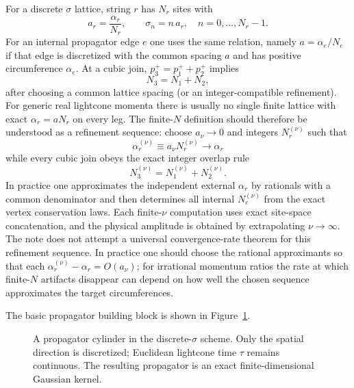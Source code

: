 \documentclass[11pt]{article}
\numberwithin{equation}{section}
\begin{document}
For a discrete $\sigma$ lattice, string $r$ has $N_r$ sites with
\begin{equation}
\label{eq:s4-003}
a_r=\frac{\alpha_r}{N_r},\qquad \sigma_n=n\,a_r,\quad n=0,\dots,N_r-1.
\end{equation}
For an internal propagator edge $e$ one uses the same relation, namely $a=\alpha_e/N_e$ if that edge is discretized with the common spacing $a$ and has positive circumference $\alpha_e$.
At a cubic join, $p_3^+=p_1^++p_2^+$ implies
\begin{equation}
\label{eq:s4-004}
N_3=N_1+N_2,
\end{equation}
after choosing a common lattice spacing (or an integer-compatible refinement).
For generic real lightcone momenta there is usually no single finite lattice with exact $\alpha_r=aN_r$ on every leg. The finite-$N$ definition should therefore be understood as a refinement sequence: choose $a_\nu\to 0$ and integers $N_r^{(\nu)}$ such that
\begin{equation}
\label{eq:s4-005}
\alpha_r^{(\nu)}\equiv a_\nu N_r^{(\nu)}\longrightarrow \alpha_r
\end{equation}
while every cubic join obeys the exact integer overlap rule
\begin{equation}
\label{eq:s4-006}
N_3^{(\nu)}=N_1^{(\nu)}+N_2^{(\nu)}.
\end{equation}
In practice one approximates the independent external $\alpha_r$ by rationals with a common denominator and then determines all internal $N_e^{(\nu)}$ from the exact vertex conservation laws. Each finite-$\nu$ computation uses exact site-space concatenation, and the physical amplitude is obtained by extrapolating $\nu\to\infty$.
The note does not attempt a universal convergence-rate theorem for this refinement sequence. In practice one should choose the rational approximants so that each $\alpha_r^{(\nu)}-\alpha_r=O(a_\nu)$; for irrational momentum ratios the rate at which finite-$N$ artifacts disappear can depend on how well the chosen sequence approximates the target circumferences.

The basic propagator building block is shown in Figure~\ref{fig:discrete-cylinder}.

\begin{figure}[t]
\centering
{}
\caption{A propagator cylinder in the discrete-$\sigma$ scheme. Only the spatial direction is discretized; Euclidean lightcone time $\tau$ remains continuous. The resulting propagator is an exact finite-dimensional Gaussian kernel.}
\label{fig:discrete-cylinder}
\end{figure}
\end{document}
